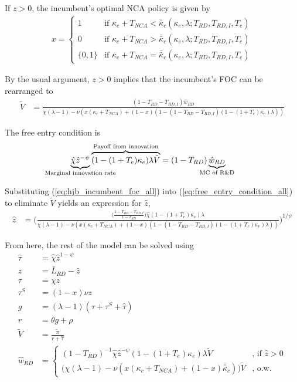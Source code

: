 \documentclass[11pt,english]{article}
\theoremstyle{remark}
\begin{document}
If $z > 0$, the incumbent's optimal NCA policy is given by 
\begin{align}
x = \begin{cases}
1 & \textrm{if } \kappa_{c} + T_{NCA} < \bar{\bar{\kappa}}_c (\kappa_e, \lambda;T_{RD},T_{RD,I},T_e)\\
0 & \textrm{if } \kappa_{c} + T_{NCA} > \bar{\bar{\kappa}}_c (\kappa_e, \lambda;T_{RD},T_{RD,I},T_e)\\
\{0,1\} & \textrm{if } \kappa_c + T_{NCA} = \bar{\bar{\kappa}}_c (\kappa_e, \lambda;T_{RD},T_{RD,I},T_e)
\end{cases} \label{eq:nca_policy_all}
\end{align}


By the usual argument, $z > 0$ implies that the incumbent's FOC can be rearranged to
\begin{align}
\tilde{V} &= \frac{(1-T_{RD} - T_{RD,I})\hat{w}_{RD}}{\chi(\lambda -1) - \nu (x(\kappa_c + T_{NCA}) + (1-x)(1 - (1-T_{RD} - T_{RD,I})(1-(1+T_e)\kappa_e)\lambda)) } \label{eq:hjb_incumbent_foc_all}
\end{align}

The free entry condition is
\begin{align}
\underbrace{\hat{\chi} \hat{z}^{-\psi}}_{\mathclap{\text{Marginal innovation rate}}} \overbrace{(1-(1+T_e)\kappa_e) \lambda \tilde{V}}^{\mathclap{\text{Payoff from innovation}}} &= (1-T_{RD})\underbrace{\hat{w}_{RD}}_{\mathclap{\text{MC of R\&D}}} \label{eq:free_entry_condition_all}
\end{align}

Substituting (\ref{eq:hjb_incumbent_foc_all}) into (\ref{eq:free_entry_condition_all}) to eliminate $\tilde{V}$ yields an expression for $\hat{z}$, 
\begin{align}
\hat{z} &= \Bigg( \frac{\Big(\frac{1-T_{RD} -T_{RD,I}}{1-T_{RD}} \Big)\hat{\chi} (1-(1+T_e)\kappa_{e}) \lambda}{\chi(\lambda -1) - \nu (x(\kappa_c + T_{NCA}) + (1-x)(1 - (1-T_{RD} - T_{RD,I})(1-(1+T_e)\kappa_e)\lambda)) } \Bigg)^{1/\psi} \label{eq:effort_entrant_all}
\end{align}

From here, the rest of the model can be solved using
\begin{align}
\hat{\tau} &= \hat{\chi} \hat{z}^{1-\psi} \\
z &= \bar{L}_{RD} - \hat{z} \label{eq:labor_resource_constraint_all}\\ 
\tau &= \chi z \\
\tau^S &= (1-x) \nu z \\
g &= (\lambda - 1) (\tau + \tau^S + \hat{\tau}) \\
r &= \theta g + \rho \\
\tilde{V} &= \frac{\tilde{\pi}}{r + \hat{\tau}} \\ 
\hat{w}_{RD} &= \begin{cases}
(1-T_{RD})^{-1}\hat{\chi} \hat{z}^{-\psi} (1-(1+T_e)\kappa_e) \lambda \tilde{V} &\textrm{, if } \hat{z} > 0\\
\Big( \chi(\lambda -1) - \nu (x(\kappa_c + T_{NCA}) + (1-x)\bar{\bar{\kappa}}_c)\Big) \tilde{V} &\textrm{, o.w.}
\end{cases} \label{eq:wage_rd_labor_all}
\end{align}
\end{document}
